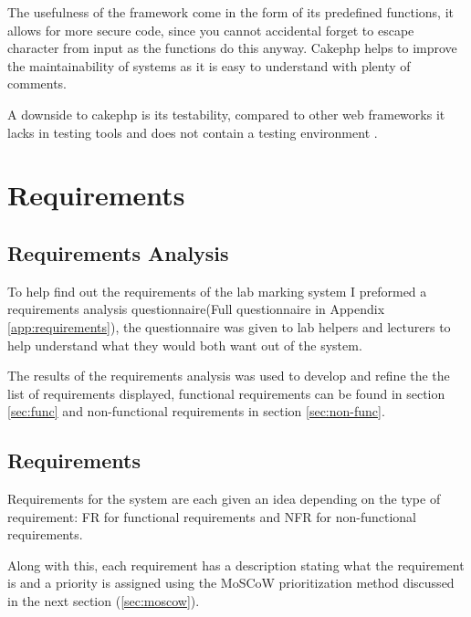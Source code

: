 \documentclass[12pt]{article}  %
\begin{document}
The usefulness of the framework come in the form of its predefined functions, it allows for more secure code, since you cannot accidental forget to escape character from input as the functions do this anyway. Cakephp helps to improve the maintainability of systems as it is easy to understand with plenty of comments.

A downside to cakephp is its testability, compared to other web frameworks it lacks in testing tools and does not contain a testing environment \cite{plekhanova_evaluating_2009}.





\newpage
\section{Requirements}
\label{section:require}
 


\subsection{Requirements Analysis}
To help find out the requirements of the lab marking system I preformed a requirements analysis questionnaire(Full questionnaire in Appendix \ref{app:requirements}), the questionnaire was given to lab helpers and lecturers to help understand what they would both want out of the system. 

The results of the requirements analysis was used to develop and refine the the list of requirements displayed, functional requirements can be found in section \ref{sec:func} and non-functional requirements in section \ref{sec:non-func}.



\subsection{Requirements}
\label{sec:requirements}
Requirements for the system are each given an idea depending on the type of requirement: FR for functional requirements and NFR for non-functional requirements.

Along with this, each requirement has a description stating what the requirement is and a  priority is assigned using the MoSCoW prioritization method discussed in the next section (\ref{sec:moscow}).
\end{document}
